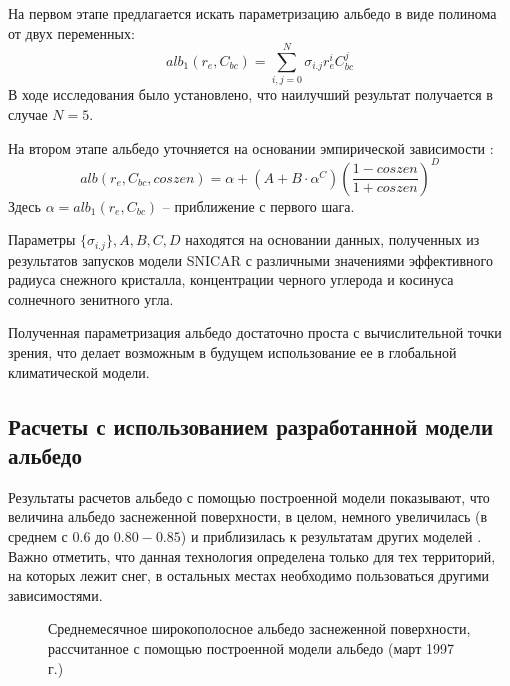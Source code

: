 \documentclass[a4paper, fontsize=14pt]{scrartcl}
\begin{document}
На первом этапе предлагается искать параметризацию альбедо в виде полинома от двух переменных:
\begin{equation}
    alb_1(r_e, C_{bc}) = \sum_{i,j = 0}^N \sigma_{i.j} r_e^i C_{bc}^j   \label{sys}  
\end{equation}
В ходе исследования \cite{mipt2020} было установлено, что наилучший результат получается в случае $N = 5$.

На втором этапе альбедо уточняется на основании эмпирической зависимости \cite{Saito2019}:
\begin{equation}
    alb(r_e, C_{bc}, coszen) = \alpha + (A + B \cdot \alpha^C) \left( \dfrac{1 - coszen}{1 + coszen} \right)^D     \label{sys}  
\end{equation}
Здесь $\alpha = alb_1(r_e, C_{bc})$ -- приближение с первого шага.

Параметры $\{ \sigma_{i.j} \}, A, B, C, D$ находятся на основании данных, полученных из результатов запусков модели SNICAR с различными значениями эффективного радиуса снежного кристалла, концентрации черного углерода и косинуса солнечного зенитного угла.

Полученная параметризация альбедо достаточно проста с вычислительной точки зрения, что делает возможным в будущем использование ее в глобальной климатической модели.

\subsection{Расчеты с использованием разработанной модели альбедо}

Результаты расчетов альбедо с помощью построенной модели показывают, что величина альбедо заснеженной поверхности, в целом, немного увеличилась (в среднем с $0.6$ до $0.80-0.85$) и приблизилась к результатам других моделей \cite{Flanner2007, Gueymard2019}. Важно отметить, что данная технология определена только для тех территорий, на которых лежит снег, в остальных местах необходимо пользоваться другими зависимостями.

\begin{figure}[h]
    \caption{Среднемесячное широкополосное альбедо заснеженной поверхности, рассчитанное с помощью построенной модели альбедо (март 1997 г.)}
    \label{fig:imageAlbOld}
\end{figure}
\end{document}
